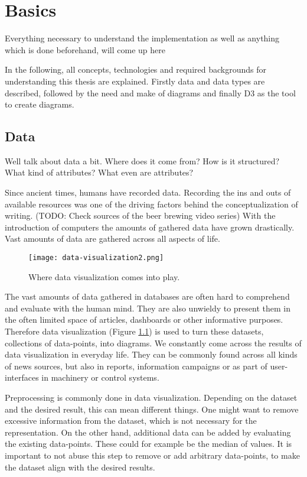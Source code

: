 \chapter{Basics}
Everything necessary to understand the implementation as well as anything which is done beforehand, will come up here

In the following, all concepts, technologies and required backgrounds for understanding this thesis are explained. Firstly data and data types are described, followed by the need and make of diagrams and finally D3 as the tool to create diagrams.


\section{Data}
Well talk about data a bit. Where does it come from? How is it structured? What kind of attributes? What even are attributes?

Since ancient times, humans have recorded data. Recording the ins and outs of available resources was one of the driving factors behind the conceptualization of writing. (TODO: Check sources of the beer brewing video series)
With the introduction of computers the amounts of gathered data have grown drastically. Vast amounts of data are gathered across all aspects of life.

\begin{figure}
    \label{fig:data-visualization}
    \texttt{[image: data-visualization2.png]}
    \caption[data-visualization]{Where data visualization comes into play.}
\end{figure}

The vast amounts of data gathered in databases are often hard to comprehend and evaluate with the human mind. They are also unwieldy to present them in the often limited space of articles, dashboards or other informative purposes. Therefore data visualization (Figure \ref{fig:data-visualization}) is used to turn these datasets, collections of data-points, into diagrams. We constantly come across the results of data visualization in everyday life. They can be commonly found across all kinds of news sources, but also in reports, information campaigns or as part of user-interfaces in machinery or control systems.

Preprocessing is commonly done in data visualization. Depending on the dataset and the desired result, this can mean different things. One might want to remove excessive information from the dataset, which is not necessary for the representation. On the other hand, additional data can be added by evaluating the existing data-points. These could for example be the median of values. It is important to not abuse this step to remove or add arbitrary data-points, to make the dataset align with the desired results.


